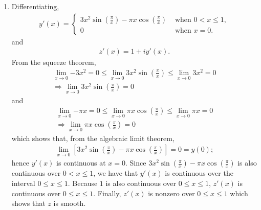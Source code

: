 \documentclass[a4paper,12pt]{article}
\begin{document}
\begin{enumerate}
\begin{enumerate}
            \item
                Differentiating,
                \begin{align*}
                    y'(x) = \begin{cases}
                        3x^2 \sin \left( \frac{\pi}{x} \right) - \pi x \cos \left( \frac{\pi}{x} \right)&\text{ when }0 < x \leq 1, \\
                        0&\text{ when }x = 0.
                    \end{cases}
                \end{align*}
                and
                \begin{align*}
                    z'(x) = 1 + iy'(x).
                \end{align*}
                From the squeeze theorem,
                \begin{gather*}
                    \lim_{x \to 0} {-3x^2} = 0 \leq \lim_{x \to 0} 3x^2 \sin \left( \frac{\pi}{x} \right) \leq \lim_{x \to 0} 3x^2 = 0 \\
                    \Rightarrow \lim_{x \to 0} 3x^2 \sin \left( \frac{\pi}{x} \right) = 0
                \end{gather*}
                and
                \begin{gather*}
                    \lim_{x \to 0} {-\pi x} = 0 \leq \lim_{x \to 0} \pi x \cos \left( \frac{\pi}{x} \right) \leq \lim_{x \to 0} \pi x = 0 \\
                    \Rightarrow \lim_{x \to 0} \pi x \cos \left( \frac{\pi}{x} \right) = 0
                \end{gather*}
                which shows that, from the algebraic limit theorem,
                \begin{align*}
                    \lim_{x \to 0} \left[ 3x^2 \sin \left( \frac{\pi}{x} \right) - \pi x \cos \left( \frac{\pi}{x} \right) \right] = 0 = y(0);
                \end{align*}
                hence $y'(x)$ is continuous at $x = 0$. Since $3x^2 \sin \left( \frac{\pi}{x} \right) - \pi x \cos \left( \frac{\pi}{x} \right)$ is also continuous over $0 < x \leq 1$, we have that $y'(x)$ is continuous over the interval $0 \leq x \leq 1$. Because $1$ is also continuous over $0 \leq x \leq 1$, $z'(x)$ is continuous over $0 \leq x \leq 1$. Finally, $z'(x)$ is nonzero over $0 \leq x \leq 1$ which shows that $z$ is smooth.
        \end{enumerate}
\end{enumerate}
\end{document}
